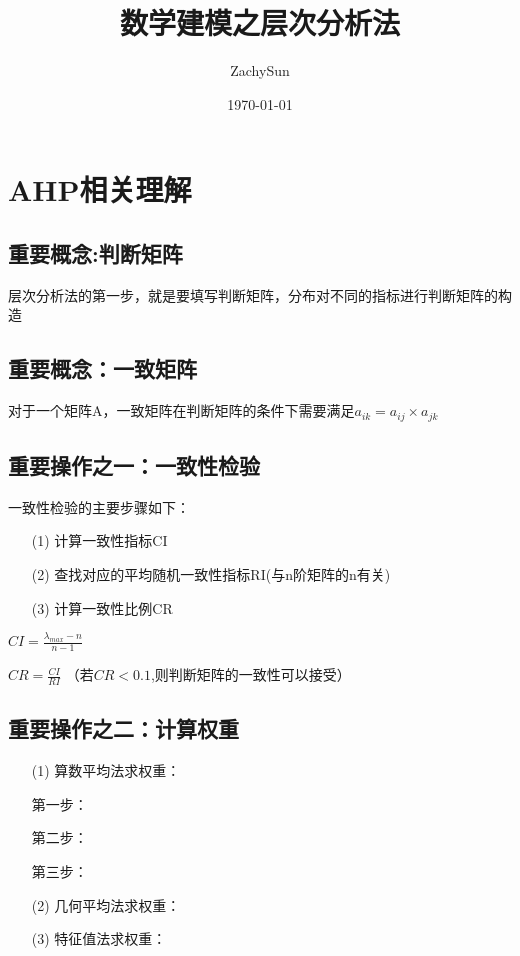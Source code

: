\documentclass[UTF8]{ctexart}
\title{数学建模之层次分析法}
\date{\today}
\author{ZachySun}
\begin{document}
\maketitle
\section{AHP相关理解}
\subsection{\textbf{重要概念:判断矩阵}}

层次分析法的第一步，就是要填写判断矩阵，分布对不同的指标进行判断矩阵的构造

\subsection{\textbf{重要概念：一致矩阵}}

对于一个矩阵A，一致矩阵在判断矩阵的条件下需要满足$a_{ik}=a_{ij}\times a_{jk}$

\subsection{\textbf{重要操作之一：一致性检验}}

一致性检验的主要步骤如下：

\begin{enumerate}
\item [(1)] 计算一致性指标CI
\item [(2)] 查找对应的平均随机一致性指标RI(与n阶矩阵的n有关)
\item [(3)] 计算一致性比例CR
\end{enumerate}

$CI=\frac{\lambda_{max}-n}{n-1} $

$CR=\frac{CI}{RI}$
（若$CR<0.1$,则判断矩阵的一致性可以接受）
\subsection{\textbf{重要操作之二：计算权重}}
\begin{enumerate}
\item [(1)] 算数平均法求权重：

第一步：

第二步：

第三步：

\item [(2)] 几何平均法求权重：

\item [(3)] 特征值法求权重：

\end{enumerate}
\end{document}
